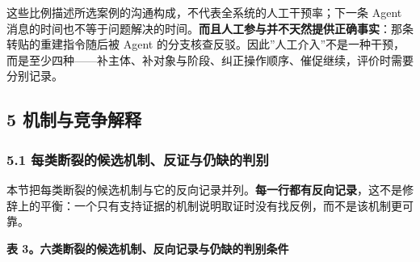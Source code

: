 \documentclass[
]{article}
\begin{document}
这些比例描述所选案例的沟通构成，不代表全系统的人工干预率；下一条 Agent
消息的时间也不等于问题解决的时间。\textbf{而且人工参与并不天然提供正确事实}：那条转贴的重建指令随后被
Agent
的分支核查反驳。因此''人工介入''不是一种干预，而是至少四种------补主体、补对象与阶段、纠正操作顺序、催促继续，评价时需要分别记录。

\subsection{5
机制与竞争解释}\label{ux673aux5236ux4e0eux7adeux4e89ux89e3ux91ca}

\subsubsection{5.1
每类断裂的候选机制、反证与仍缺的判别}\label{ux6bcfux7c7bux65adux88c2ux7684ux5019ux9009ux673aux5236ux53cdux8bc1ux4e0eux4ecdux7f3aux7684ux5224ux522b}

本节把每类断裂的候选机制与它的反向记录并列。\textbf{每一行都有反向记录}，这不是修辞上的平衡：一个只有支持证据的机制说明取证时没有找反例，而不是该机制更可靠。

\textbf{表 3。六类断裂的候选机制、反向记录与仍缺的判别条件}
\end{document}
